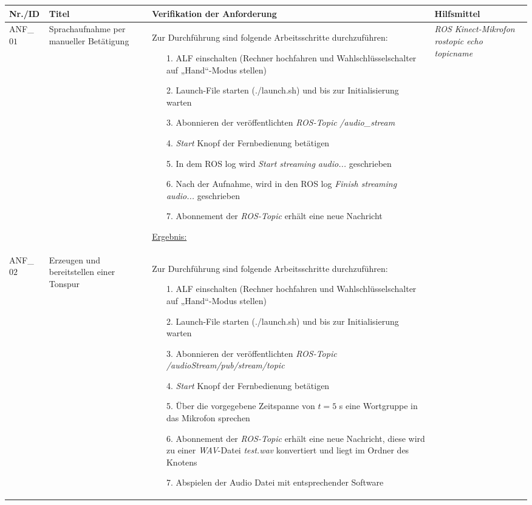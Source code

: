 \documentclass[12pt,a4paper,oneside,numbers=noenddot,captions=tableheading,toc=bibliography,openany,tikz,margin=5mm]{scrbook}
\begin{document}
	\begin{longtable}{|p{}|p{}|p{7cm}|p{}|} 
	\hline
	\textbf{Nr./ID} & \textbf{Titel} & \textbf{Verifikation der Anforderung} & \textbf{Hilfsmittel}\\
	\endhead


	\hline

ANF\_$01$ & Sprachaufnahme per manueller Betätigung & Zur Durchführung sind folgende Arbeitsschritte durchzuführen:
\begin{itemize}
	
	\item[1.]	ALF einschalten (Rechner hochfahren und Wahlschlüsselschalter auf „Hand“-Modus stellen)
	\item[2.]	Launch-File starten (./launch.sh) und bis zur Initialisierung warten
	\item[3.]	Abonnieren der veröffentlichten \textit{ROS-Topic} \textit{/audio_stream}
	\item[4.]	\textit{Start} Knopf der Fernbedienung betätigen
	\item[5.]	In dem ROS log wird \textit{Start streaming audio...} geschrieben
	\item[6.]	Nach der Aufnahme, wird in den ROS log \textit{Finish streaming audio...} geschrieben
	\item[7.]	Abonnement der \textit{ROS-Topic} erhält eine neue Nachricht
	
	
\end{itemize}

\underline{Ergebnis:}\newline
\newline

\textbf{}	%
& \textit{ROS}\newline
\textit{Kinect-Mikrofon}\newline
\textit{rostopic echo topicname}\newline
\\
\hline

ANF\_$02$ & Erzeugen und bereitstellen einer Tonspur & Zur Durchführung sind folgende Arbeitsschritte durchzuführen:
\begin{itemize}
	
	\item[1.]	ALF einschalten (Rechner hochfahren und Wahlschlüsselschalter auf „Hand“-Modus stellen)
	\item[2.]	Launch-File starten (./launch.sh) und bis zur Initialisierung warten
	\item[3.]	Abonnieren der veröffentlichten \textit{ROS-Topic} \textit{/audioStream/pub/stream/topic}
	\item[4.]	\textit{Start} Knopf der Fernbedienung betätigen
	\item[5.]	Über die vorgegebene Zeitspanne von $t=5$ s eine Wortgruppe in das Mikrofon sprechen
	\item[6.]	Abonnement der \textit{ROS-Topic} erhält eine neue Nachricht, diese wird zu einer \textit{WAV}-Datei \textit{test.wav} konvertiert und liegt im Ordner des Knotens
	\item[7.]	Abspielen der Audio Datei mit entsprechender Software
\end{itemize}


\end{longtable}
\end{document}
